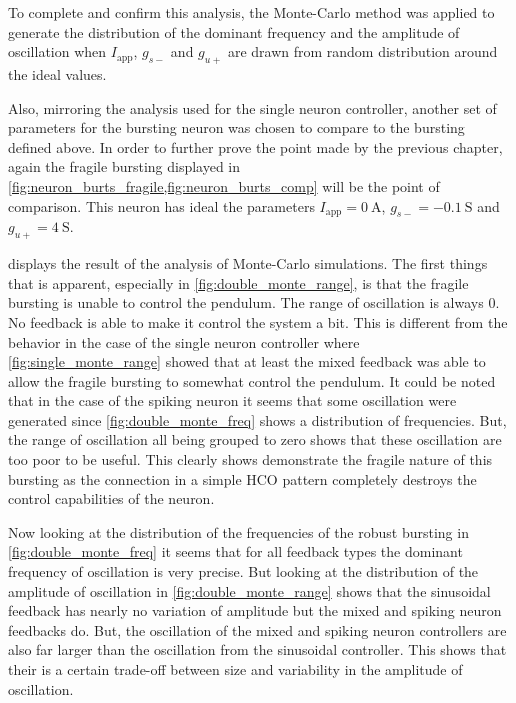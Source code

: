 To complete and confirm this analysis, the Monte-Carlo method was applied to generate the distribution of the dominant frequency and the amplitude of oscillation when $I_\text{app}$, $g_{s-}$ and $g_{u+}$ are drawn from random distribution around the ideal values.

Also, mirroring the analysis used for the single neuron controller, another set of parameters for the bursting neuron was chosen to compare to the bursting defined above. 
In order to further prove the point made by the previous chapter, again the fragile bursting displayed in \cref{fig:neuron_burts_fragile,fig:neuron_burts_comp} will be the point of comparison.
This neuron has ideal the parameters $I_\text{app} = \qty{0}{\ampere}$, $g_{s-} = \qty{-0.1}{\siemens}$ and $g_{u+} = \qty{4}{\siemens}$. 

 displays the result of the analysis of Monte-Carlo simulations. 
The first things that is apparent, especially in \cref{fig:double_monte_range}, is that the fragile bursting is unable to control the pendulum.
The range of oscillation is always 0. 
No feedback is able to make it control the system a bit.
This is different from the behavior in the case of the single neuron controller where \cref{fig:single_monte_range} showed that at least the mixed feedback was able to allow the fragile bursting to somewhat control the pendulum.
It could be noted that in the case of the spiking neuron it seems that some oscillation were generated since \cref{fig:double_monte_freq} shows a distribution of frequencies.
But, the range of oscillation all being grouped to zero shows that these oscillation are too poor to be useful.
This clearly shows demonstrate the fragile nature of this bursting as the connection in a simple HCO pattern completely destroys the control capabilities of the neuron.

Now looking at the distribution of the frequencies of the robust bursting in \cref{fig:double_monte_freq} it seems that for all feedback types the dominant frequency of oscillation is very precise. But looking at the distribution of the amplitude of oscillation in \cref{fig:double_monte_range} shows that the sinusoidal feedback has nearly no variation of amplitude but the mixed and spiking neuron feedbacks do.
But, the oscillation of the  mixed and spiking neuron controllers are also far larger than the oscillation from the sinusoidal controller. 
This shows that their is a certain trade-off between size and variability in the amplitude of oscillation.

